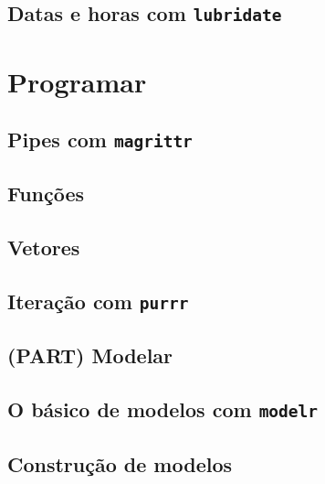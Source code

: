 \documentclass[
]{latex/krantz}
\theoremstyle{definition}
\theoremstyle{definition}
\theoremstyle{definition}
\theoremstyle{definition}
\theoremstyle{remark}
\begin{document}
\hypertarget{datas-e-horas-com-lubridate}{%
\chapter{\texorpdfstring{Datas e horas com \texttt{lubridate}}{Datas e horas com lubridate}}\label{datas-e-horas-com-lubridate}}

\hypertarget{part-programar}{%
\part{Programar}\label{part-programar}}

\hypertarget{pipes-com-magrittr}{%
\chapter{\texorpdfstring{Pipes com \texttt{magrittr}}{Pipes com magrittr}}\label{pipes-com-magrittr}}

\hypertarget{funuxe7uxf5es}{%
\chapter{Funções}\label{funuxe7uxf5es}}

\hypertarget{vetores}{%
\chapter{Vetores}\label{vetores}}

\hypertarget{iterauxe7uxe3o-com-purrr}{%
\chapter{\texorpdfstring{Iteração com \texttt{purrr}}{Iteração com purrr}}\label{iterauxe7uxe3o-com-purrr}}

\hypertarget{part-modelar}{%
\chapter{(PART) Modelar}\label{part-modelar}}

\hypertarget{o-buxe1sico-de-modelos-com-modelr}{%
\chapter{\texorpdfstring{O básico de modelos com \texttt{modelr}}{O básico de modelos com modelr}}\label{o-buxe1sico-de-modelos-com-modelr}}

\hypertarget{construuxe7uxe3o-de-modelos}{%
\chapter{Construção de modelos}\label{construuxe7uxe3o-de-modelos}}
\end{document}
